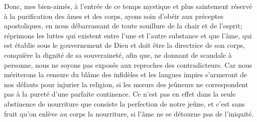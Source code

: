 Donc, mes bien-aimés, à l’entrée de ce temps mystique
	et plus saintement réservé à la purification des âmes et des corps,
	ayons soin d’obéir aux préceptes apostoliques,
	en nous débarrassant de toute souillure de la chair et de l’esprit;
	réprimons les luttes qui existent entre l’une et l’autre substance
	et que l’âme, qui est établie sous le gouvernement de Dieu
		et doit être la directrice de son corps,
	conquière la dignité de sa souveraineté,
	afin que, ne donnant de scandale à personne,
	nous ne soyons pas exposés aux reproches des contradicteurs.
Car nous mériterons la censure du blâme des infidèles
	et les langues impies s’armeront de nos défauts pour injurier la religion,
	si les mœurs des jeûneurs
		ne correspondent pas à la pureté d’une parfaite continence.
Ce n’est pas en effet dans la seule abstinence de nourriture
	que consiste la perfection de notre jeûne,
	et c’est sans fruit qu’on enlève au corps la nourriture,
	si l’âme ne se détourne pas de l’iniquité.
